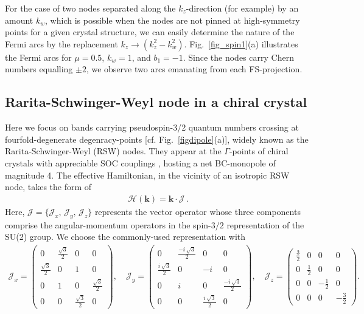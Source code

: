 \documentclass[aps,prb,onecolumn, footinbib, 10pt]{revtex4-2}
\begin{document}
For the case of two nodes separated along the $ k_z$-direction (for example) by an amount $k_w$, which is possible when the nodes are not pinned at high-symmetry points for a given crystal structure, we can easily determine the nature of the Fermi arcs by the replacement $ k_z \rightarrow (k_z^2 - k_w^2)$. Fig.~\ref{fig_spin1}(a) illustrates the Fermi arcs for $\mu=0.5$, $k_w =1$, and $b_1=-1$. Since the nodes carry Chern numbers equalling $\pm 2$, we observe two arcs emanating from each FS-projection.


\subsection{Rarita-Schwinger-Weyl node in a chiral crystal}

Here we focus on bands carrying pseudospin-3/2 quantum numbers crossing at fourfold-degenerate degenracy-points [cf. Fig.~\ref{figdipole}(a)], widely known as the Rarita-Schwinger-Weyl (RSW) nodes. They appear at the $\Gamma$-points of chiral crystals with appreciable SOC couplings \cite{grushin-multifold, multifold-rhsi, Yao2020, ips-rsw-ph,ips-shreya,ips-internode}, hosting a net BC-monopole of magnitude 4. The effective Hamiltonian, in the vicinity of an isotropic RSW node, takes the form of
\begin{align}
\mathcal{H}(\boldsymbol{k}) =   {\boldsymbol k} \cdot \boldsymbol{\mathcal J} \,.
\end{align}
Here, $ \boldsymbol{\mathcal J } = \lbrace {\mathcal J }_x,\, {\mathcal J }_y,\, {\mathcal J }_z \rbrace $ represents the vector operator whose three components comprise the angular-momentum operators in the spin-$3/2$ representation of the SU(2) group. We choose the commonly-used representation with
\begin{align}
{\mathcal J }_x= 
\begin{pmatrix}
	0 & \frac{\sqrt{3}}{2} & 0 & 0 \\
	\frac{\sqrt{3}}{2} & 0 & 1 & 0 \\
	0 & 1 & 0 & \frac{\sqrt{3}}{2} \\
	0 & 0 & \frac{\sqrt{3}}{2} & 0 
\end{pmatrix} , \quad
{\mathcal J }_y=
\begin{pmatrix}
	0 & \frac{-i \,  \sqrt{3}}{2}  & 0 & 0 \\
	\frac{i \, \sqrt{3}}{2} & 0 & -i & 0 \\
	0 & i & 0 & \frac{-i \, \sqrt{3}}{2}  \\
	0 & 0 & \frac{i \, \sqrt{3}}{2} & 0 
\end{pmatrix}, \quad
{\mathcal J }_z =
\begin{pmatrix}
	\frac{3}{2} & 0 & 0 & 0 \\
	0 & \frac{1}{2} & 0 & 0 \\
	0 & 0 & -\frac{1}{2} & 0 \\
	0 & 0 & 0 & -\frac{3}{2} 
\end{pmatrix}.
\end{align}
\end{document}
